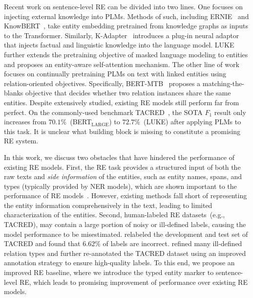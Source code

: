 \documentclass[11pt,a4paper]{article}
\begin{document}
Recent work on sentence-level RE can be divided into two lines.
One focuses on injecting external knowledge into PLMs.
Methods of such, including ERNIE~\cite{zhang-etal-2019-ernie} and KnowBERT~\cite{peters-etal-2019-knowledge}, take entity embedding pretrained from knowledge graphs as inputs to the Transformer.
Similarly, K-Adapter~\cite{wang2020k} introduces a plug-in neural adaptor that injects factual and linguistic knowledge into the language model.
LUKE~\cite{yamada-etal-2020-luke} further extends the pretraining objective of masked language modeling to entities and proposes an entity-aware self-attention mechanism.
The other line of work focuses on continually pretraining PLMs on text with linked entities using relation-oriented objectives.
Specifically, BERT-MTB~\cite{baldini-soares-etal-2019-matching} proposes a matching-the-blanks objective that decides whether two relation instances share the same entities.
Despite extensively studied, existing RE models still perform far from perfect.
On the commonly-used benchmark TACRED~\cite{zhang-etal-2017-position}, the SOTA $F_1$ result only increases from $70.1\%$~(BERT$_{\text{LARGE}}$) to $72.7\%$~(LUKE) after applying PLMs to this task.
It is unclear what building block is missing to constitute a promising RE system. 

In this work, we discuss two obstacles that have hindered the performance of existing RE models.
First, the RE task provides a structured input of both the raw texts and \emph{side information} of the entities, such as entity names, spans, and types (typically provided by NER models), which are shown important to the performance of RE models~\cite{peng-etal-2020-learning}.
However, existing methods fall short of representing the entity information comprehensively in the text, leading to limited characterization of the entities.
Second, human-labeled RE datasets~(e.g., TACRED), may contain a large portion of noisy or ill-defined labels, causing the model performance to be misestimated.
\citet{alt-etal-2020-tacred} relabeled the development and test set of TACRED and found that $6.62\%$ of labels are incorrect.
\citet{stoica2021re} refined many ill-defined relation types and further re-annotated the TACRED dataset using an improved annotation strategy to ensure high-quality labels.
To this end, we propose an improved RE baseline, where we introduce the typed entity marker to sentence-level RE, which leads to promising improvement of performance over existing RE models.
\end{document}
